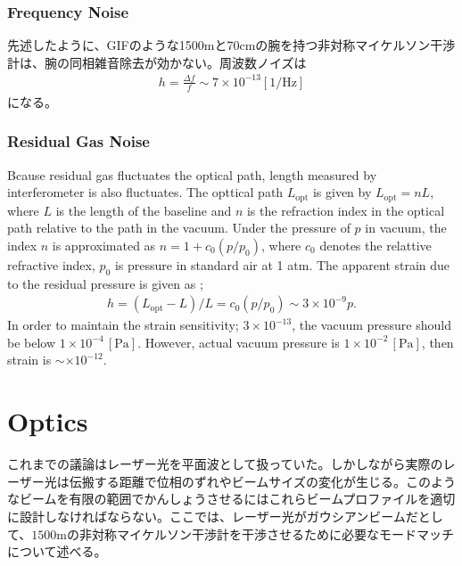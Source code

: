 \subsubsection{Frequency Noise}
先述したように、GIFのような1500mと70cmの腕を持つ非対称マイケルソン干渉計は、腕の同相雑音除去が効かない。周波数ノイズは
\begin{eqnarray}
  h = \frac{\Delta{f}}{f} \sim 7\times10^{-13} [\mathrm{1/\mathrm{Hz}}]
\end{eqnarray}
になる\cite{araya2017design}。

\subsubsection{Residual Gas Noise}
Bcause residual gas fluctuates the optical path, length measured by interferometer is also fluctuates. The opttical path $L_{\mathrm{opt}}$ is given by $L_{\mathrm{opt}}=nL$, where $L$ is the length of the baseline and $n$ is the refraction index in the optical path relative to the path in the vacuum. Under the pressure of $p$ in vacuum, the index $n$ is approximated as $n = 1 + c_0(p/p_0)$, where $c_0$ denotes the relattive refractive index, $p_0$ is pressure in standard air at 1 atm. The apparent strain due to the residual pressure is given as \cite{ciddor1996refractive};
\begin{eqnarray}
  h = (L_{\mathrm{opt}}-L)/L = c_0(p/p_0) \sim 3\times10^{-9} p.
\end{eqnarray}
In order to maintain the strain sensitivity; $3\times10^{-13}$, the vacuum pressure should be below $1\times10^{-4}\,[\mathrm{Pa}]$. However, actual vacuum pressure is $1\times10^{-2}\,[\mathrm{Pa}]$, then strain is $\sim\times10^{-12}$.



\section{Optics} \label{sec:sec43} %
これまでの議論はレーザー光を平面波として扱っていた。しかしながら実際のレーザー光は伝搬する距離で位相のずれやビームサイズの変化が生じる。このようなビームを有限の範囲でかんしょうさせるにはこれらビームプロファイルを適切に設計しなければならない。ここでは、レーザー光がガウシアンビームだとして、$1500\mathrm{m}$の非対称マイケルソン干渉計を干渉させるために必要なモードマッチについて述べる。

